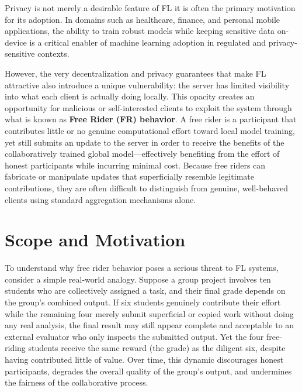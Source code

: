 Privacy is not merely a desirable feature of FL it is often the primary motivation for its adoption. In domains such as healthcare, finance, and personal mobile applications, the ability to train robust models while keeping sensitive data on-device is a critical enabler of machine learning adoption in regulated and privacy-sensitive contexts.

However, the very decentralization and privacy guarantees that make FL attractive also introduce a unique vulnerability: the server has limited visibility into what each client is actually doing locally. This opacity creates an opportunity for malicious or self-interested clients to exploit the system through what is known as \textbf{Free Rider (FR) behavior}. A free rider is a participant that contributes little or no genuine computational effort toward local model training, yet still submits an update to the server in order to receive the benefits of the collaboratively trained global model—effectively benefiting from the effort of honest participants while incurring minimal cost. Because free riders can fabricate or manipulate updates that superficially resemble legitimate contributions, they are often difficult to distinguish from genuine, well-behaved clients using standard aggregation mechanisms alone.





\section{Scope and Motivation}
\label{sec:scope-motivation}

To understand why free rider behavior poses a serious threat to FL systems, consider a simple real-world analogy. Suppose a group project involves ten students who are collectively assigned a task, and their final grade depends on the group's combined output. If six students genuinely contribute their effort while the remaining four merely submit superficial or copied work without doing any real analysis, the final result may still appear complete and acceptable to an external evaluator who only inspects the submitted output. Yet the four free-riding students receive the same reward (the grade) as the diligent six, despite having contributed little of value. Over time, this dynamic discourages honest participants, degrades the overall quality of the group's output, and undermines the fairness of the collaborative process.

